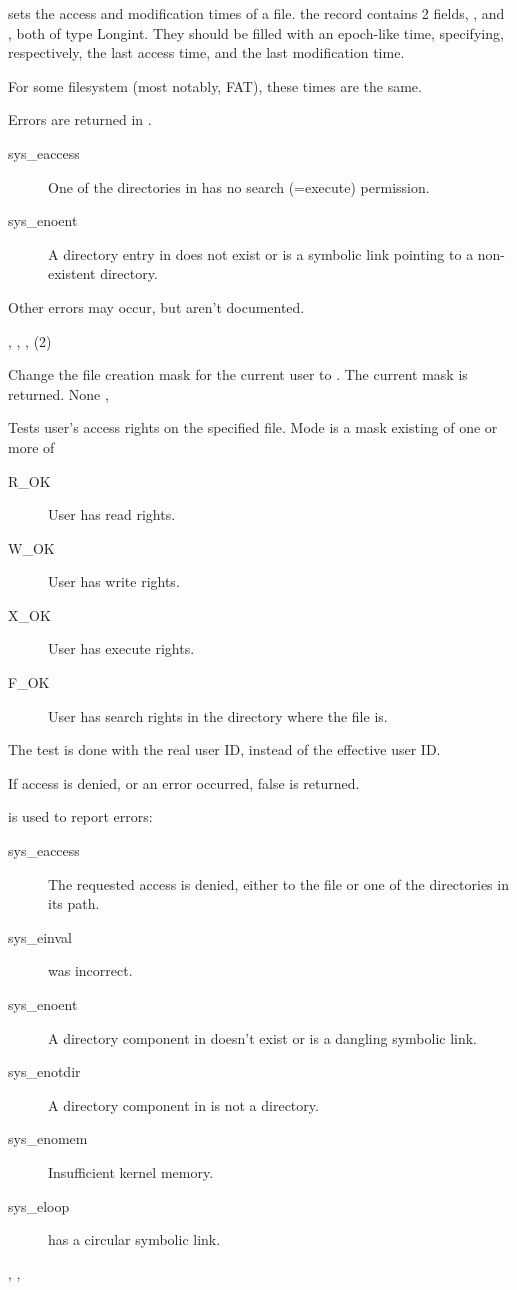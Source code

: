 

{
 sets the access and modification times of a file.
the  record contains 2 fields, , and ,
both of type Longint. They should be filled with an epoch-like time,
specifying, respectively, the last access time, and the last modification
time. 

For some filesystem (most notably, FAT), these times are the same. 
}
{Errors are returned in .
\begin{description}
\item[sys\_eaccess] One of the directories in  has no
search (=execute) permission.
\item[sys\_enoent] A directory entry in  does
not exist or is a symbolic link pointing to a non-existent directory.
\end{description}
Other errors may occur, but aren't documented.
}
{, , , (2)}



{
Change the file creation mask for the current user to . The
current mask is returned.
}
{None}
{, }



{
Tests user's access rights on the specified file. Mode is a mask existing of
one or more of
\begin{description}
\item[R\_OK] User has read rights.
\item[W\_OK] User has write rights.
\item[X\_OK] User has execute rights.
\item[F\_OK] User has search rights in the directory where the file is.
\end{description}
The test is done with the real user ID, instead of the effective user ID.

If access is denied, or an error occurred, false is returned.
}
{  is used to report errors:
\begin{description}
\item[sys\_eaccess] The requested access is denied, either to the file or one
of the directories in its path.
\item[sys\_einval]  was incorrect.
\item[sys\_enoent] A directory component in  doesn't exist or is a
dangling symbolic link.
\item[sys\_enotdir] A directory component in  is not a directory.
\item[sys\_enomem] Insufficient kernel memory.
\item[sys\_eloop]  has a circular symbolic link.
\end{description}
}
{, ,  }

